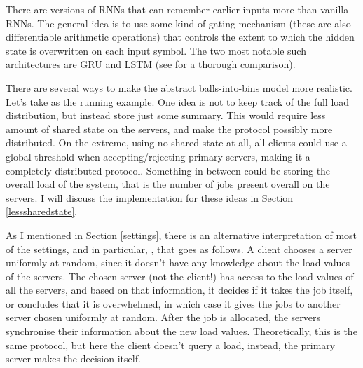 
There are versions of RNNs that can remember earlier inputs more than vanilla RNNs. The general idea is to use some kind of gating mechanism (these are also differentiable arithmetic operations) that controls the extent to which the hidden state is overwritten on each input symbol. The two most notable such architectures are GRU and LSTM (see \cite{shewalkar2019rnngrulstm} for a thorough comparison).


\iffalse
There are several ways to make the abstract balls-into-bins model more realistic. Let's take \TwoThinning as the running example. One idea is not to keep track of the full load distribution, but instead store just some summary. This would require less amount of shared state on the servers, and make the protocol possibly more distributed. On the extreme, using no shared state at all, all clients could use a global threshold when accepting/rejecting primary servers, making it a completely distributed protocol. Something in-between could be storing the overall load of the system, that is the number of jobs present overall on the servers. I will discuss the implementation for these ideas in Section \ref{lesssharedstate}.


As I mentioned in Section \ref{settings}, there is an alternative interpretation of most of the settings, and in particular, \TwoThinning, that goes as follows. A client chooses a server uniformly at random, since it doesn't have any knowledge about the load values of the servers. The chosen server (not the client!) has access to the load values of all the servers, and based on that information, it decides if it takes the job itself, or concludes that it is overwhelmed, in which case it gives the jobs to another server chosen uniformly at random. After the job is allocated, the servers synchronise their information about the new load values. Theoretically, this is the same \TwoThinning protocol, but here the client doesn't query a load, instead, the primary server makes the decision itself.


